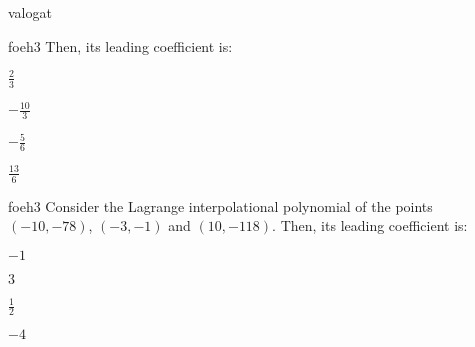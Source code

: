 \documentclass[12pt]{article}
\begin{document}
\begin{quiz}{valogat}
\begin{multi}{foeh3}
Then, its leading coefficient is:
\item* $ \frac{2}{3} $
\item  $ -\frac{10}{3} $
\item  $ -\frac{5}{6} $
\item  $ \frac{13}{6} $
\end{multi}
\begin{multi}{foeh3}
Consider the Lagrange interpolational polynomial of the points $(-10,-78)$, $(-3,-1)$ and $(10,-118)$.
Then, its leading coefficient is:
\item* $ -1 $
\item  $ 3 $
\item  $ \frac{1}{2} $
\item  $ -4 $
\end{multi}
\end{quiz}
\end{document}
